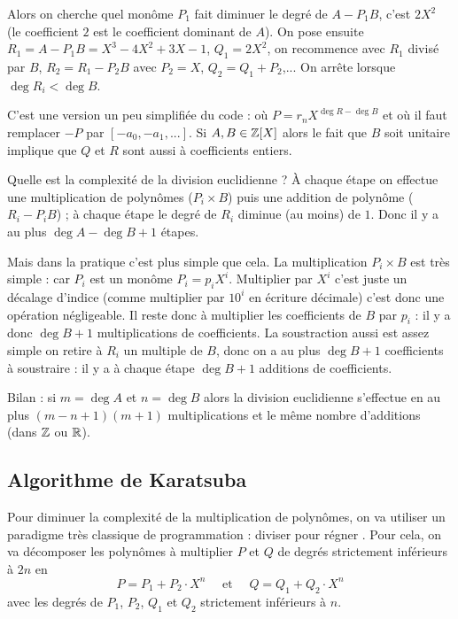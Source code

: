 \documentclass[class=report,crop=false]{standalone}
\begin{document}
\begin{enumerate}
  Alors on cherche quel monôme $P_1$ fait diminuer le degré de $A-P_1B$, c'est $2X^2$
  (le coefficient $2$ est le coefficient dominant de $A$).
  On pose ensuite $R_1=A-P_1B=X^3-4X^2+3X-1$, $Q_1 = 2X^2$, on recommence avec $R_1$ divisé par $B$,
  $R_2 = R_1-P_2B$ avec $P_2 = X$, $Q_2= Q_1+P_2$,... On arrête lorsque $\deg R_i < \deg B$.



   C'est une version un peu simplifiée du code : où $P = r_nX^{\deg R - \deg B}$ et où il faut remplacer
  $-P$ par $[-a_0,-a_1,...]$.
  Si $A,B \in \mathbb{Z}[X]$ alors le fait que $B$ soit unitaire implique que $Q$ et $R$ sont aussi à coefficients entiers.


  \medskip

  Quelle est la complexité de la division euclidienne ?
  \`A chaque étape on effectue une multiplication de polynômes ($P_i \times B$) puis une addition de polynôme
  ($R_i - P_iB$) ; à chaque étape le degré de $R_i$ diminue (au moins) de $1$. Donc il y a au plus $\deg A-\deg B+1$ étapes.

  Mais dans la pratique c'est plus simple que cela. La multiplication $P_i \times B$ est très simple :
  car $P_i$ est un monôme $P_i = p_i X^i$. Multiplier par $X^i$ c'est juste un décalage d'indice (comme multiplier par $10^i$
  en écriture décimale) c'est donc une opération négligeable. Il reste donc à multiplier les coefficients de $B$ par $p_i$ :
  il y a donc $\deg B+1$ multiplications de coefficients. La soustraction aussi est assez simple
  on retire à $R_i$ un multiple de $B$, donc on a au plus $\deg B+1$ coefficients à soustraire : il y a à chaque étape
  $\deg B +1$ additions de coefficients.

  Bilan : si $m=\deg A$ et $n=\deg B$ alors la division euclidienne s'effectue en au plus $(m-n+1)(m+1)$ multiplications et
  le même nombre d'additions (dans $\mathbb{Z}$ ou $\mathbb{R}$).

\end{enumerate}



\subsection{Algorithme de Karatsuba}

Pour diminuer la complexité de la multiplication de polynômes,
on va utiliser un paradigme très classique de programmation :
\og diviser pour régner \fg. Pour cela, on va décomposer les polynômes à multiplier $P$ et $Q$
de degrés strictement inférieurs à $2n$ en
$$P = P_1 + P_2 \cdot X^n \quad \text{ et } \quad Q = Q_1 + Q_2 \cdot X^n$$
avec les degrés de $P_1$, $P_2$, $Q_1$ et $Q_2$ strictement inférieurs à $n$.
\end{document}
